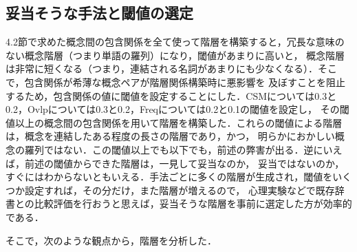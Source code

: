 \documentclass[japanese]{jnlp_1.4}
\begin{document}
\subsection{妥当そうな手法と閾値の選定}

4.2節で求めた概念間の包含関係を全て使って階層を構築すると，冗長な意味のない概念階層（つまり単語の羅列）になり，閾値があまりに高いと，
概念階層は非常に短くなる（つまり，連結される名詞があまりにも少なくなる）．そこで，包含関係が希薄な概念ペアが階層関係構築時に悪影響を
及ぼすことを阻止するため，包含関係の値に閾値を設定することにした．CSMについては0.3と0.2，Ovlpについては0.3と0.2，Freqについては0.2と0.1の閾値を設定し，
その閾値以上の概念間の包含関係を用いて階層を構築した．これらの閾値による階層は，概念を連結したある程度の長さの階層であり，かつ，
明らかにおかしい概念の羅列ではない．この閾値以上でも以下でも，前述の弊害が出る．逆にいえば，前述の閾値からできた階層は，一見して妥当なのか，
妥当ではないのか，すぐにはわからないともいえる．手法ごとに多くの階層が生成され，閾値をいくつか設定すれば，その分だけ，また階層が増えるので，
心理実験などで既存辞書との比較評価を行おうと思えば，妥当そうな階層を事前に選定した方が効率的である．

そこで，次のような観点から，階層を分析した．
\end{document}
